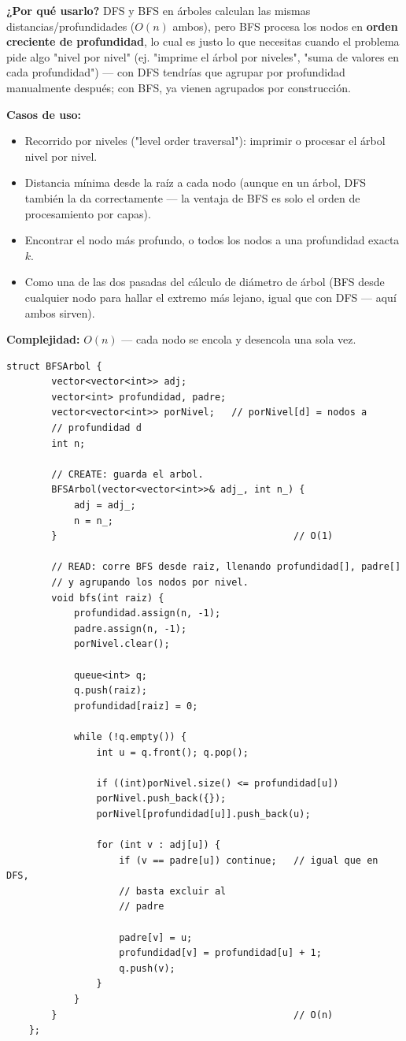 \documentclass[10pt,a4paper,twocolumn]{article}
\begin{document}
\textbf{¿Por qué usarlo?} DFS y BFS en árboles calculan las mismas
distancias/profundidades ($O(n)$ ambos), pero BFS procesa los nodos
en \textbf{orden creciente de profundidad}, lo cual es justo lo que
necesitas cuando el problema pide algo "nivel por nivel" (ej.
"imprime el árbol por niveles", "suma de valores en cada
profundidad") — con DFS tendrías que agrupar por profundidad
manualmente después; con BFS, ya vienen agrupados por construcción.

\textbf{Casos de uso:}

\begin{itemize}
	\item Recorrido por niveles ("level order traversal"): imprimir o
	procesar el árbol nivel por nivel.
	\item Distancia mínima desde la raíz a cada nodo (aunque en un
	árbol, DFS también la da correctamente — la ventaja de BFS es
	solo el orden de procesamiento por capas).
	\item Encontrar el nodo más profundo, o todos los nodos a una
	profundidad exacta $k$.
	\item Como una de las dos pasadas del cálculo de diámetro de
	árbol (BFS desde cualquier nodo para hallar el extremo más
	lejano, igual que con DFS — aquí ambos sirven).
\end{itemize}

\textbf{Complejidad:} $O(n)$ — cada nodo se encola y desencola una
sola vez.

\begin{lstlisting}[style=cpp]
	struct BFSArbol {
		vector<vector<int>> adj;
		vector<int> profundidad, padre;
		vector<vector<int>> porNivel;   // porNivel[d] = nodos a
		// profundidad d
		int n;
		
		// CREATE: guarda el arbol.
		BFSArbol(vector<vector<int>>& adj_, int n_) {
			adj = adj_;
			n = n_;
		}                                          // O(1)
		
		// READ: corre BFS desde raiz, llenando profundidad[], padre[]
		// y agrupando los nodos por nivel.
		void bfs(int raiz) {
			profundidad.assign(n, -1);
			padre.assign(n, -1);
			porNivel.clear();
			
			queue<int> q;
			q.push(raiz);
			profundidad[raiz] = 0;
			
			while (!q.empty()) {
				int u = q.front(); q.pop();
				
				if ((int)porNivel.size() <= profundidad[u])
				porNivel.push_back({});
				porNivel[profundidad[u]].push_back(u);
				
				for (int v : adj[u]) {
					if (v == padre[u]) continue;   // igual que en DFS,
					// basta excluir al
					// padre
					
					padre[v] = u;
					profundidad[v] = profundidad[u] + 1;
					q.push(v);
				}
			}
		}                                          // O(n)
	};
\end{lstlisting}
\end{document}
